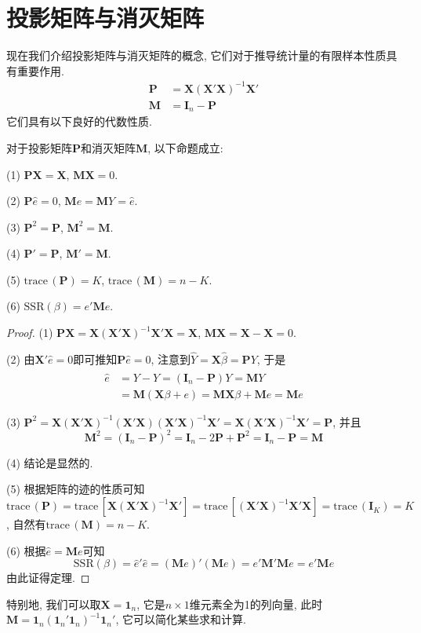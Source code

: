 \documentclass[cn, 12pt, math=mtpro2, bibstyle=apa, blue, twocol]{elegantbook}
\newcommand{\X}{\mathbold{X}}
\newcommand{\M}{\mathbold{M}}
\begin{document}
\section{投影矩阵与消灭矩阵}
现在我们介绍投影矩阵与消灭矩阵的概念, 它们对于推导统计量的有限样本性质具有重要作用.
\begin{align*}
\mathbold{P}&=\X(\X'\X)^{-1}\X' \\
\mathbold{M}&=\mathbold{I}_n-\mathbold{P}
\end{align*}
它们具有以下良好的代数性质.
\begin{theorem}\label{thm:thm2.8}
  对于投影矩阵$\mathbold{P}$和消灭矩阵$\mathbold{M}$, 以下命题成立:

  (1) $\mathbold{PX}=\X$, $\mathbold{MX}=0$.

  (2) $\mathbold{P}\hat{e}=0$, $\mathbold{M}e=\M Y=\hat{e}$.

  (3) $\mathbold{P}^2=\mathbold{P}$, $\mathbold{M}^2=\mathbold{M}$.

  (4) $\mathbold{P}'=\mathbold{P}$, $\mathbold{M}'=\mathbold{M}$.

  (5) $\text{trace}\,(\mathbold{P})=K$, $\text{trace}\,(\mathbold{M})=n-K$.

  (6) $\text{SSR}(\beta)=e'\mathbold{M}e$.
\end{theorem}
\begin{proof}
  (1) $\mathbold{PX}=\X(\X'\X)^{-1}\X'\X=\X$, $\mathbold{MX}=\X-\X=0$.

  (2) 由$\X'\hat{e}=0$即可推知$\mathbold{P}\hat{e}=0$, 注意到$\hat{Y}=\mathbold{X}\hat{\beta}=\mathbold{P}Y$, 于是
  \begin{align*}
  \hat{e}&=Y-\hat{Y}=(\mathbold{I}_n-\mathbold{P})Y=\mathbold{M}Y \\
  &=\mathbold{M}(\X\beta+e)=\mathbold{MX}\beta+\mathbold{M}e=\mathbold{M}e
  \end{align*}

  (3) $\mathbold{P}^2=\X(\X'\X)^{-1}(\X'\X)(\X'\X)^{-1}\X'=\X(\X'\X)^{-1}\X'=\mathbold{P}$, 并且
  $$\mathbold{M}^2=(\mathbold{I}_n-\mathbold{P})^2=\mathbold{I}_n-2\mathbold{P}+\mathbold{P}^2=\mathbold{I}_n-\mathbold{P}=\mathbold{M}$$

  (4) 结论是显然的.

  (5) 根据矩阵的迹的性质可知$\text{trace}\,(\mathbold{P})=\text{trace}\,[\X(\X'\X)^{-1}\X']=\text{trace}\,[(\X'\X)^{-1}\X'\X]=\text{trace}\,(\mathbold{I}_K)=K$, 自然有$\text{trace}\,(\mathbold{M})=n-K$.

  (6) 根据$\hat{e}=\mathbold{M}e$可知
  $$\text{SSR}(\beta)=\hat{e}'\hat{e}=(\mathbold{M}e)'(\mathbold{M}e)=e'\mathbold{M}'\mathbold{M}e=e'\mathbold{M}e$$
  由此证得定理.
\end{proof}
特别地, 我们可以取$\X=\mathbf{1}_n$, 它是$n\times1$维元素全为1的列向量, 此时$\M=\mathbf{1}_n(\mathbf{1}_n'\mathbf{1}_n)^{-1}\mathbf{1}_n'$, 它可以简化某些求和计算.
\end{document}
